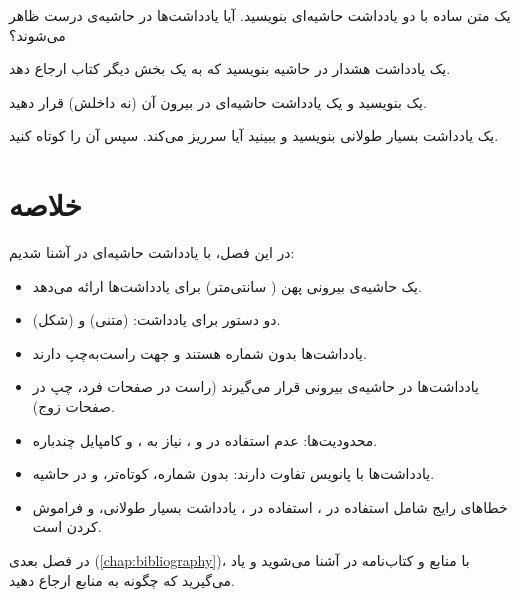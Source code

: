 \begin{exercise}
    یک متن ساده با دو یادداشت حاشیه‌ای بنویسید.
    آیا یادداشت‌ها در حاشیه‌ی درست ظاهر
    می‌شوند؟
    \label{exc:margin-notes-basic}
\end{exercise}

\begin{exercise}
    یک یادداشت هشدار در حاشیه بنویسید که
    به یک بخش دیگر کتاب ارجاع دهد.
    \label{exc:margin-notes-warning}
\end{exercise}

\begin{exercise}
    یک  بنویسید و یک یادداشت
    حاشیه‌ای در بیرون آن (نه داخلش) قرار
    دهید.
    \label{exc:margin-notes-outside}
\end{exercise}

\begin{exercise}
    یک یادداشت بسیار طولانی بنویسید و ببینید
    آیا سرریز می‌کند. سپس آن را کوتاه کنید.
    \label{exc:margin-notes-long}
\end{exercise}

\section{خلاصه}
\label{sec:margin-notes-summary}

در این فصل، با یادداشت حاشیه‌ای در 
آشنا شدیم:

\begin{itemize}
    \item {} یک حاشیه‌ی بیرونی پهن
    ( سانتی‌متر) برای یادداشت‌ها ارائه
    می‌دهد.

    \item دو دستور برای یادداشت:
     (متنی) و  (شکل).

    \item یادداشت‌ها بدون شماره هستند و جهت
    راست‌به‌چپ دارند.

    \item یادداشت‌ها در حاشیه‌ی بیرونی قرار
    می‌گیرند (راست در صفحات فرد، چپ در
    صفحات زوج).

    \item محدودیت‌ها: عدم استفاده در
     و ، نیاز به
    ، و کامپایل چندباره.

    \item یادداشت‌ها با پانویس تفاوت دارند:
    بدون شماره، کوتاه‌تر، و در حاشیه.

    \item خطاهای رایج شامل استفاده در
    ، استفاده در ،
    یادداشت بسیار طولانی، و فراموش کردن
     است.
\end{itemize}

در فصل بعدی (\cref{chap:bibliography})، با
منابع و کتاب‌نامه در  آشنا
می‌شوید و یاد می‌گیرید که چگونه به منابع
ارجاع دهید.